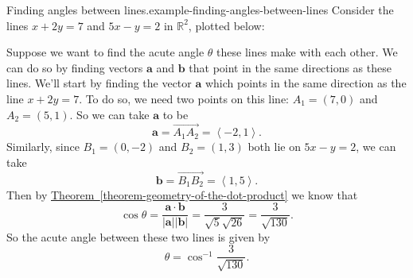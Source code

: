 \documentclass[10pt,]{book}
\numberwithin{equation}{section}
\newcommand{\RR}{\mathbb{R}}
\newcommand{\vv}[1]{\mathbf{#1}}
\newcommand{\dotprod}[1]{\left\langle #1 \right\rangle}
\begin{document}
\begin{example}{Finding angles between lines.}{example-finding-angles-between-lines}%
\hypertarget{p-1148}{}%
Consider the lines \(x+2y = 7\) and \(5x-y = 2\) in \(\RR^{2}\), plotted below:%
\begin{figure}
\centering
{
}
\end{figure}
\hypertarget{p-1149}{}%
Suppose we want to find the acute angle \(\theta\) these lines make with each other. We can do so by finding vectors \(\vv{a}\) and \(\vv{b}\) that point in the same directions as these lines. We'll start by finding the vector \(\vv{a}\) which points in the same direction as the line \(x+2y=7\). To do so, we need two points on this line: \(A_{1} = (7,0)\) and \(A_{2} = (5,1)\). So we can take \(\vv{a}\) to be%
%
\begin{equation*}
\vv{a} = \overrightarrow{A_{1}A_{2}} = \dotprod{-2,1}.
\end{equation*}
\hypertarget{p-1150}{}%
Similarly, since \(B_{1} = (0,-2)\) and \(B_{2} = (1,3)\) both lie on \(5x-y = 2\), we can take%
%
\begin{equation*}
\vv{b} = \overrightarrow{B_{1}B_{2}} = \dotprod{1,5}.
\end{equation*}
\hypertarget{p-1151}{}%
Then by \hyperref[theorem-geometry-of-the-dot-product]{Theorem~\ref{theorem-geometry-of-the-dot-product}} we know that%
%
\begin{equation*}
\cos\theta = \frac{\vv{a}\cdot\vv{b}}{|\vv{a}||\vv{b}|} = \frac{3}{\sqrt{5}\sqrt{26}} = \frac{3}{\sqrt{130}}.
\end{equation*}
\hypertarget{p-1152}{}%
So the acute angle between these two lines is given by%
%
\begin{equation*}
\theta = \cos^{-1}\frac{3}{\sqrt{130}}.
\end{equation*}
\end{example}
%
%
\typeout{************************************************}
\typeout{************************************************}
%
\end{document}

